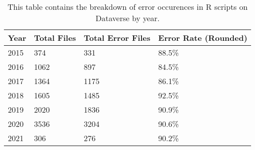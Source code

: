 \begin{table}
\centering
\caption{This table contains the breakdown of error occurences in R scripts on Dataverse by year.}
\label{tab:year-breakdown}
\begin{tabular}{llll}
\toprule
Year & Total Files & Total Error Files & Error Rate (Rounded) \\
\midrule
2015 &         374 &               331 &                88.5\% \\ \hline
2016 &        1062 &               897 &                84.5\% \\ \hline
2017 &        1364 &              1175 &                86.1\% \\ \hline
2018 &        1605 &              1485 &                92.5\% \\ \hline
2019 &        2020 &              1836 &                90.9\% \\ \hline
2020 &        3536 &              3204 &                90.6\% \\ \hline
2021 &         306 &               276 &                90.2\% \\
\bottomrule
\end{tabular}
\end{table}
